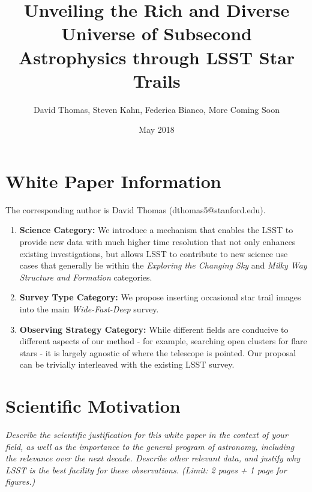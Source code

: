 \documentclass[12pt, letterpaper]{article}
\title{Unveiling the Rich and Diverse Universe of Subsecond Astrophysics through LSST Star Trails}
\author{David Thomas, Steven Kahn, Federica Bianco, {\color{green}More Coming Soon}}
\date{May 2018}
\begin{document}
\maketitle


\section{White Paper Information}
The corresponding author is David Thomas (dthomas5@stanford.edu).

\begin{enumerate} 
\item {\bf Science Category:} We introduce a mechanism that enables the LSST to provide new data with much higher time resolution that not only enhances existing investigations, but allows LSST to contribute to new science use cases that generally lie within the \textit{Exploring the Changing Sky} and \textit{Milky Way Structure and Formation} categories.

\item {\bf Survey Type Category:} We propose inserting occasional star trail images into the main \textit{Wide-Fast-Deep} survey.

\item {\bf Observing Strategy Category:}
While different fields are conducive to different aspects of our method - for example, searching open clusters for flare stars - it is largely agnostic of where the telescope is pointed. Our proposal can be trivially interleaved with the existing LSST survey.

\end{enumerate}  


\clearpage

\section{Scientific Motivation}

\begin{footnotesize}
{\it Describe the scientific justification for this white paper in the context
of your field, as well as the importance to the general program of astronomy, 
including the relevance over the next decade. 
Describe other relevant data, and justify why LSST is the best facility for these observations.
(Limit: 2 pages + 1 page for figures.)}
\end{footnotesize}
\\
\end{document}
